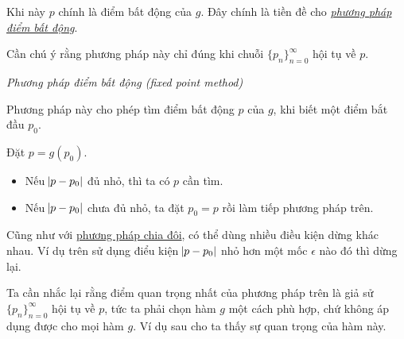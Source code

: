 \documentclass[../../Lectures]{subfiles}
\begin{document}
Khi này \(p\) chính là điểm bất động của \(g\). Đây chính là tiền đề cho
\hyperref[method:fixed_point]{\emph{phương pháp điểm bất động}}.

Cần chú ý rằng phương pháp này chỉ đúng khi chuỗi \(\{p_n\}_{n=0}^\infty\) hội
tụ về \(p\).

\begin{method}\label{method:fixed_point}
    \emph{Phương pháp điểm bất động (fixed point method)}

    Phương pháp này cho phép tìm điểm bất động \(p\) của \(g\), khi biết một
    điểm bắt đầu \(p_0\).

    Đặt \(p = g(p_0)\).

    \begin{itemize}
        \item Nếu \(\abs{p - p_0}\) đủ nhỏ, thì ta có \(p\) cần tìm.
        \item Nếu \(\abs{p - p_0}\) chưa đủ nhỏ, ta đặt \(p_0 = p\) rồi làm tiếp
            phương pháp trên.
    \end{itemize}
\end{method}

Cũng như với \hyperref[method:bisection]{phương pháp chia đôi}, có thể dùng
nhiều điều kiện dừng khác nhau. Ví dụ trên sử dụng điểu kiện \(\abs{p - p_0}\)
nhỏ hơn một mốc \(\epsilon\) nào đó thì dừng lại.

Ta cần nhắc lại rằng điểm quan trọng nhất của phương pháp trên là giả sử
\(\{p_n\}_{n=0}^\infty\) hội tụ về \(p\), tức ta phải chọn hàm \(g\) một cách
phù hợp, chứ không áp dụng được cho mọi hàm \(g\). Ví dụ sau cho ta thấy sự quan
trọng của hàm này.
\end{document}
